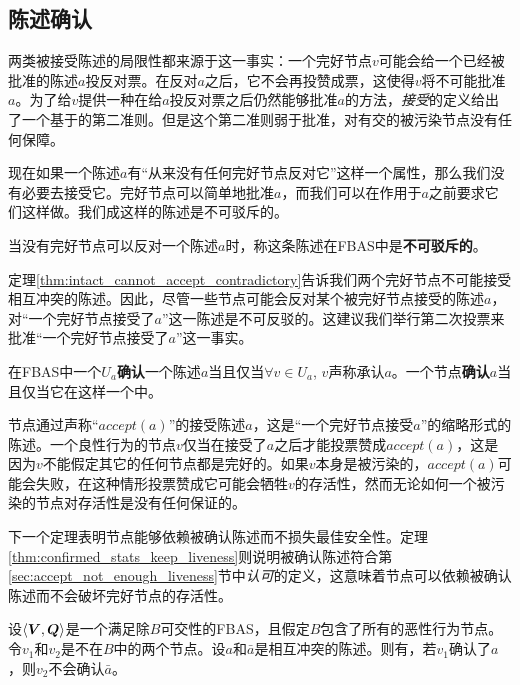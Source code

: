 \subsection{陈述确认}

两类被接受陈述的局限性都来源于这一事实：一个完好节点$v$可能会给一个已经被批准的陈述$a$投反对票。在反对$a$之后，它不会再投赞成票，这使得$v$将不可能批准$a$。为了给$v$提供一种在给$a$投反对票之后仍然能够批准$a$的方法，\textit{接受}的定义给出了一个基于{\vblock}的第二准则。但是这个第二准则弱于批准，对有{\quorum}交的被污染节点没有任何保障。

现在如果一个陈述$a$有``从来没有任何完好节点反对它''这样一个属性，那么我们没有必要去接受它。完好节点可以简单地批准$a$，而我们可以在作用于$a$之前要求它们这样做。我们成这样的陈述是不可驳斥的。

\begin{definition}[不可驳斥]
	当没有完好节点可以反对一个陈述$a$时，称这条陈述在FBAS中是\textbf{不可驳斥的}。
\end{definition}

定理\ref{thm:intact_cannot_accept_contradictory}告诉我们两个完好节点不可能接受相互冲突的陈述。因此，尽管一些节点可能会反对某个被完好节点接受的陈述$a$，对``一个完好节点接受了$a$''这一陈述是不可反驳的。这建议我们举行第二次投票来批准``一个完好节点接受了$a$''这一事实。

\begin{definition}[确认]
	在FBAS中一个{\quorum}$U_a$\textbf{确认}一个陈述$a$当且仅当$\forall v\in U_a$, $v$声称承认$a$。一个节点\textbf{确认}$a$当且仅当它在这样一个{\quorum}中。
\end{definition}

节点通过声称``$accept(a)$''的接受陈述$a$，这是``一个完好节点接受$a$''的缩略形式的陈述。一个良性行为的节点$v$仅当在接受了$a$之后才能投票赞成$accept(a)$，这是因为$v$不能假定其它的任何节点都是完好的。如果$v$本身是被污染的，$accept(a)$可能会失败，在这种情形投票赞成它可能会牺牲$v$的存活性，然而无论如何一个被污染的节点对存活性是没有任何保证的。

下一个定理表明节点能够依赖被确认陈述而不损失最佳安全性。定理\ref{thm:confirmed_stats_keep_liveness}则说明被确认陈述符合第\ref{sec:accept_not_enough_liveness}节中\textit{认可}的定义，这意味着节点可以依赖被确认陈述而不会破坏完好节点的存活性。

\begin{theorem}\label{thm:confirmed_stats_keep_safety}
	设$\langle{\bm V},{\bm Q}\rangle$是一个满足除$B${\quorum}可交性的FBAS，且假定$B$包含了所有的恶性行为节点。令$v_1$和$v_2$是不在$B$中的两个节点。设$a$和$\bar a$是相互冲突的陈述。则有，若$v_1$确认了$a$，则$v_2$不会确认$\bar a$。
\end{theorem}

